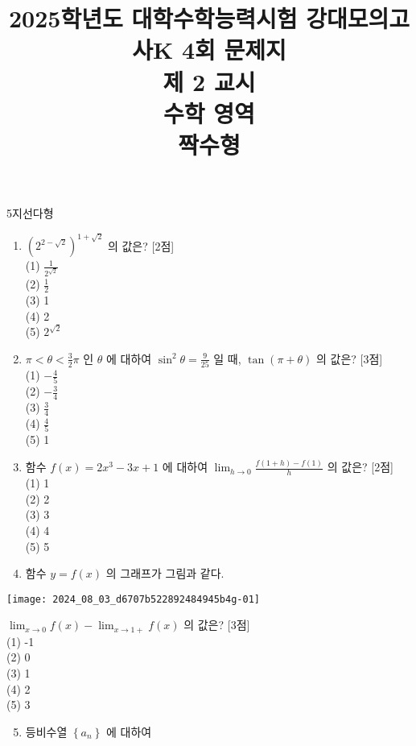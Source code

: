 \documentclass[10pt]{article}
\title{2025학년도 대학수학능력시험 강대모의고사K 4회 문제지 \\
 제 2 교시 \\
 수학 영역 \\
 짝수형 }
\author{}
\date{}
\begin{document}
\maketitle
5지선다형

\begin{enumerate}
  \item \(\left(2^{2-\sqrt{2}}\right)^{1+\sqrt{2}}\) 의 값은? [2점]\\
(1) \(\frac{1}{2^{\sqrt{2}}}\)\\
(2) \(\frac{1}{2}\)\\
(3) 1\\
(4) 2\\
(5) \(2^{\sqrt{2}}\)

  \item \(\pi<\theta<\frac{3}{2} \pi\) 인 \(\theta\) 에 대하여 \(\sin ^{2} \theta=\frac{9}{25}\) 일 때, \(\tan (\pi+\theta)\) 의 값은? [3점]\\
(1) \(-\frac{4}{5}\)\\
(2) \(-\frac{3}{4}\)\\
(3) \(\frac{3}{4}\)\\
(4) \(\frac{4}{5}\)\\
(5) 1

  \item 함수 \(f(x)=2 x^{3}-3 x+1\) 에 대하여 \(\lim _{h \rightarrow 0} \frac{f(1+h)-f(1)}{h}\) 의 값은? [2점]\\
(1) 1\\
(2) 2\\
(3) 3\\
(4) 4\\
(5) 5

  \item 함수 \(y=f(x)\) 의 그래프가 그림과 같다.

\end{enumerate}

\begin{center}
\texttt{[image: 2024\_08\_03\_d6707b522892484945b4g-01]}
\end{center}

\(\lim _{x \rightarrow 0} f(x)-\lim _{x \rightarrow 1+} f(x)\) 의 값은? [3점]\\
(1) -1\\
(2) 0\\
(3) 1\\
(4) 2\\
(5) 3

\begin{enumerate}
  \setcounter{enumi}{4}
  \item 등비수열 \(\left\{a_{n}\right\}\) 에 대하여
\end{enumerate}
\end{document}
